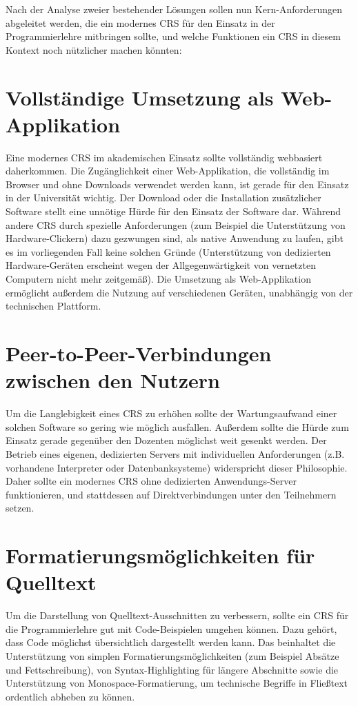 Nach der Analyse zweier bestehender Lösungen sollen nun Kern-Anforderungen abgeleitet werden, die ein modernes CRS für den Einsatz in der Programmierlehre mitbringen sollte, und welche Funktionen ein CRS in diesem Kontext noch nützlicher machen könnten:

\section{Vollständige Umsetzung als Web-Applikation}
\label{chap:webbasiert}
Eine modernes CRS im akademischen Einsatz sollte vollständig webbasiert daherkommen. Die Zugänglichkeit einer Web-Applikation, die vollständig im Browser und ohne Downloads verwendet werden kann, ist gerade für den Einsatz in der Universität wichtig. Der Download oder die Installation zusätzlicher Software stellt eine unnötige Hürde für den Einsatz der Software dar. Während andere CRS durch spezielle Anforderungen (zum Beispiel die Unterstützung von Hardware-Clickern) dazu gezwungen sind, als native Anwendung zu laufen, gibt es im vorliegenden Fall keine solchen Gründe (Unterstützung von dedizierten Hardware-Geräten erscheint wegen der Allgegenwärtigkeit von vernetzten Computern nicht mehr zeitgemäß). Die Umsetzung als Web-Applikation ermöglicht außerdem die Nutzung auf verschiedenen Geräten, unabhängig von der technischen Plattform.

\section{Peer-to-Peer-Verbindungen zwischen den Nutzern}
\label{chap:anforderung_p2p}
Um die Langlebigkeit eines CRS zu erhöhen sollte der Wartungsaufwand einer solchen Software so gering wie möglich ausfallen. Außerdem sollte die Hürde zum Einsatz gerade gegenüber den Dozenten möglichst weit gesenkt werden. Der Betrieb eines eigenen, dedizierten Servers mit individuellen Anforderungen (z.B. vorhandene Interpreter oder Datenbanksysteme) widerspricht dieser Philosophie. Daher sollte ein modernes CRS ohne dedizierten Anwendungs-Server funktionieren, und stattdessen auf Direktverbindungen unter den Teilnehmern setzen.

\section{Formatierungsmöglichkeiten für Quelltext}
\label{chap:codeformatierung}
Um die Darstellung von Quelltext-Ausschnitten zu verbessern, sollte ein CRS für die Programmierlehre gut mit Code-Beispielen umgehen können. Dazu gehört, dass Code möglichst übersichtlich dargestellt werden kann. Das beinhaltet die Unterstützung von simplen Formatierungsmöglichkeiten (zum Beispiel Absätze und Fettschreibung), von Syntax-Highlighting für längere Abschnitte sowie die Unterstützung von Monospace-Formatierung, um technische Begriffe in Fließtext ordentlich abheben zu können.

